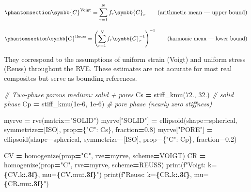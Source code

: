 \documentclass[
  a4paper,
  numbers=noendperiod,
  DIV=12]{scrreprt}
\newenvironment{Shaded}{\begin{snugshade}}{\end{snugshade}}
\newcommand{\BuiltInTok}[1]{#1}
\newcommand{\CommentTok}[1]{\textcolor[rgb]{0.56,0.35,0.01}{\textit{#1}}}
\newcommand{\FloatTok}[1]{\textcolor[rgb]{0.00,0.00,0.81}{#1}}
\newcommand{\NormalTok}[1]{#1}
\newcommand{\OperatorTok}[1]{\textcolor[rgb]{0.81,0.36,0.00}{\textbf{#1}}}
\newcommand{\SpecialCharTok}[1]{\textcolor[rgb]{0.81,0.36,0.00}{\textbf{#1}}}
\newcommand{\SpecialStringTok}[1]{\textcolor[rgb]{0.31,0.60,0.02}{#1}}
\newcommand{\StringTok}[1]{\textcolor[rgb]{0.31,0.60,0.02}{#1}}
\newcommand{\uuuu}[1]{{\symbb{{#1}}}}
\begin{document}
\begin{equation}\protect\phantomsection\label{eq-voigt}{
\uuuu{C}^\textrm{Voigt} = \sum_{r=1}^N f_r \uuuu{C}_r
\qquad\text{(arithmetic mean — upper bound)}
}\end{equation}

\begin{equation}\protect\phantomsection\label{eq-reuss}{
\uuuu{C}^\textrm{Reuss} = \left(\sum_{r=1}^N f_r \uuuu{C}_r^{-1}\right)^{-1}
\qquad\text{(harmonic mean — lower bound)}
}\end{equation}

They correspond to the assumptions of uniform strain (Voigt) and uniform
stress (Reuss) throughout the RVE. These estimates are not accurate for
most real composites but serve as bounding references.

\begin{Shaded}
\begin{Highlighting}[]
\CommentTok{\# Two{-}phase porous medium: solid + pores}
\NormalTok{Cs }\OperatorTok{=}\NormalTok{ stiff\_kmu(}\FloatTok{72.}\NormalTok{, }\FloatTok{32.}\NormalTok{)   }\CommentTok{\# solid phase}
\NormalTok{Cp }\OperatorTok{=}\NormalTok{ stiff\_kmu(}\FloatTok{1e{-}6}\NormalTok{, }\FloatTok{1e{-}6}\NormalTok{) }\CommentTok{\# pore phase (nearly zero stiffness)}

\NormalTok{myrve }\OperatorTok{=}\NormalTok{ rve(matrix}\OperatorTok{=}\StringTok{"SOLID"}\NormalTok{)}
\NormalTok{myrve[}\StringTok{"SOLID"}\NormalTok{] }\OperatorTok{=}\NormalTok{ ellipsoid(shape}\OperatorTok{=}\NormalTok{spherical, symmetrize}\OperatorTok{=}\NormalTok{[ISO],}
\NormalTok{                            prop}\OperatorTok{=}\NormalTok{\{}\StringTok{"C"}\NormalTok{: Cs\}, fraction}\OperatorTok{=}\FloatTok{0.8}\NormalTok{)}
\NormalTok{myrve[}\StringTok{"PORE"}\NormalTok{]  }\OperatorTok{=}\NormalTok{ ellipsoid(shape}\OperatorTok{=}\NormalTok{spherical, symmetrize}\OperatorTok{=}\NormalTok{[ISO],}
\NormalTok{                            prop}\OperatorTok{=}\NormalTok{\{}\StringTok{"C"}\NormalTok{: Cp\}, fraction}\OperatorTok{=}\FloatTok{0.2}\NormalTok{)}

\NormalTok{CV }\OperatorTok{=}\NormalTok{ homogenize(prop}\OperatorTok{=}\StringTok{"C"}\NormalTok{, rve}\OperatorTok{=}\NormalTok{myrve, scheme}\OperatorTok{=}\NormalTok{VOIGT)}
\NormalTok{CR }\OperatorTok{=}\NormalTok{ homogenize(prop}\OperatorTok{=}\StringTok{"C"}\NormalTok{, rve}\OperatorTok{=}\NormalTok{myrve, scheme}\OperatorTok{=}\NormalTok{REUSS)}
\BuiltInTok{print}\NormalTok{(}\SpecialStringTok{f"Voigt: k=}\SpecialCharTok{\{}\NormalTok{CV}\SpecialCharTok{.}\NormalTok{k}\SpecialCharTok{:.3f\}}\SpecialStringTok{, mu=}\SpecialCharTok{\{}\NormalTok{CV}\SpecialCharTok{.}\NormalTok{mu}\SpecialCharTok{:.3f\}}\SpecialStringTok{"}\NormalTok{)}
\BuiltInTok{print}\NormalTok{(}\SpecialStringTok{f"Reuss: k=}\SpecialCharTok{\{}\NormalTok{CR}\SpecialCharTok{.}\NormalTok{k}\SpecialCharTok{:.3f\}}\SpecialStringTok{, mu=}\SpecialCharTok{\{}\NormalTok{CR}\SpecialCharTok{.}\NormalTok{mu}\SpecialCharTok{:.3f\}}\SpecialStringTok{"}\NormalTok{)}
\end{Highlighting}
\end{Shaded}
\end{document}
